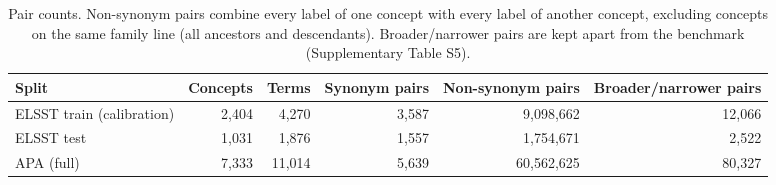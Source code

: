 \begin{table}[ht]
\centering
\small
\caption{Pair counts. Non-synonym pairs combine every label of one concept with every label of another concept, excluding concepts on the same family line (all ancestors and descendants). Broader/narrower pairs are kept apart from the benchmark (Supplementary Table S5).}
\label{tab:S1_pair_counts}
\begin{tabular}{lrrrrr}
\toprule
Split & Concepts & Terms & Synonym pairs & Non-synonym pairs & Broader/narrower pairs \\
\midrule
ELSST train (calibration) & 2,404 & 4,270 & 3,587 & 9,098,662 & 12,066 \\
ELSST test & 1,031 & 1,876 & 1,557 & 1,754,671 & 2,522 \\
APA (full) & 7,333 & 11,014 & 5,639 & 60,562,625 & 80,327 \\
\bottomrule
\end{tabular}
\end{table}
